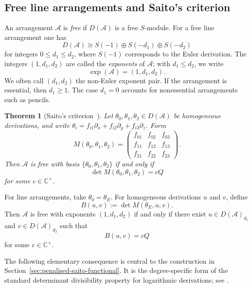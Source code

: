 \documentclass[pdflatex,sn-mathphys-num]{sn-jnl}%
\renewcommand{\det}{\mathop\mathrm{det}\nolimits}
\newtheorem{theorem}{Theorem}
\theoremstyle{remark}
\theoremstyle{definition}
\begin{document}
\subsection{Free line arrangements and Saito's criterion}

An arrangement $\mathcal{A}$ is \emph{free} if $D(\mathcal{A})$ is a free
$S$-module. For a free line arrangement one has
\[
D(\mathcal{A})
\cong S(-1)\oplus S(-d_1)\oplus S(-d_2)
\]
for integers $0\leq d_1\leq d_2$, where $S(-1)$ corresponds to the Euler
derivation. The integers $(1,d_1,d_2)$ are called the \emph{exponents} of $\mathcal{A}$; with $d_1\leq d_2$, we write
\[
\exp(\mathcal{A})=(1,d_1,d_2).
\] 
We often call $(d_1,d_2)$ the non-Euler exponent pair. If the arrangement is essential,
then $d_1\geq1$. The case $d_1=0$ accounts for nonessential arrangements
such as pencils.

\begin{theorem}[Saito's criterion~\cite{Saito1980}]
\label{thm:Saito-criterion}
Let $\theta_0,\theta_1,\theta_2\in D(\mathcal{A})$ be homogeneous
derivations, and write
$\theta_i=f_{i1}\partial_x+f_{i2}\partial_y+f_{i3}\partial_z$. Form
\[
M(\theta_0,\theta_1,\theta_2)
=
\begin{pmatrix}
f_{01}&f_{02}&f_{03}\\
f_{11}&f_{12}&f_{13}\\
f_{21}&f_{22}&f_{23}
\end{pmatrix}.
\]
Then $\mathcal{A}$ is free with basis
$\{\theta_0,\theta_1,\theta_2\}$ if and only if
\[
\det M(\theta_0,\theta_1,\theta_2)=cQ
\]
for some $c\in\mathbb C^\times$.
\end{theorem}

For line arrangements, take $\theta_0=\theta_E$. For homogeneous
derivations $u$ and $v$, define
\begin{equation}
\label{eq:B-map}
B(u,v):=\det M(\theta_E,u,v).
\end{equation}
Then $\mathcal{A}$ is free with exponents $(1,d_1,d_2)$ if and only if there
exist $u\in D(\mathcal{A})_{d_1}$ and $v\in D(\mathcal{A})_{d_2}$ such that
\begin{equation}
\label{eq:Saito-det}
B(u,v)=cQ
\end{equation}
for some $c\in\mathbb C^\times$.

The following elementary consequence is central to the construction in Section~\ref{sec:penalised-saito-functional}. It is the degree-specific form of the standard determinant divisibility property for logarithmic derivations; see \cite[Proposition~4.12]{Orlik1992}.
\end{document}
